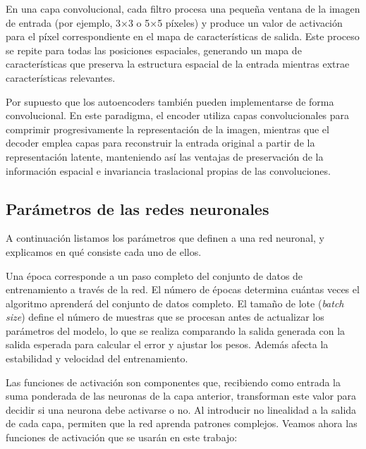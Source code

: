 En una capa convolucional, cada filtro procesa una pequeña ventana de la imagen de entrada (por ejemplo, 3×3 o 5×5 píxeles) y produce un valor de activación para el píxel correspondiente en el mapa de características de salida. Este proceso se repite para todas las posiciones espaciales, generando un mapa de características que preserva la estructura espacial de la entrada mientras extrae características relevantes.

Por supuesto que los autoencoders también pueden implementarse de forma convolucional. En este paradigma, el encoder utiliza capas convolucionales para comprimir progresivamente la representación de la imagen, mientras que el decoder emplea capas para reconstruir la entrada original a partir de la representación latente, manteniendo así las ventajas de preservación de la información espacial e invariancia traslacional propias de las convoluciones.

\subsection{Parámetros de las redes neuronales}\label{sec:params_red}

A continuación listamos los parámetros que definen a una red neuronal, y explicamos en qué consiste cada uno de ellos.

Una época corresponde a un paso completo del conjunto de datos de entrenamiento a través de la red. El número de épocas determina cuántas veces el algoritmo aprenderá del conjunto de datos completo.  El tamaño de lote (\emph{batch size}) define el número de muestras que se procesan antes de actualizar los parámetros del modelo, lo que se realiza comparando la salida generada con la salida esperada para calcular el error y ajustar los pesos. Además afecta la estabilidad y velocidad del entrenamiento.


Las funciones de activación son componentes que, recibiendo como entrada la suma ponderada de las neuronas de la capa anterior, transforman este valor para decidir si una neurona debe activarse o no. Al introducir no linealidad a la salida de cada capa, permiten que la red aprenda patrones complejos. Veamos ahora las funciones de activación que se usarán en este trabajo:

